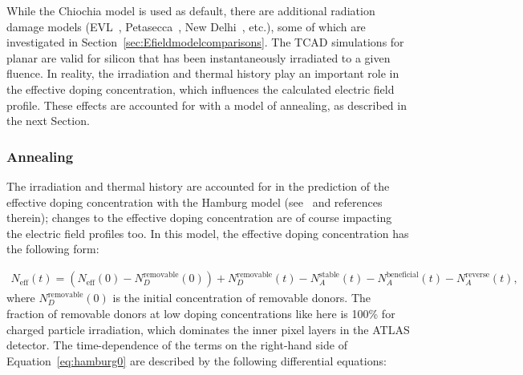

While the Chiochia model is used as default, there are additional radiation damage models (EVL~\cite{bib:DP}, Petasecca~\cite{1710302}, New Delhi~\cite{dalal2014simulation}, etc.), some of which are investigated in Section~\ref{sec:Efieldmodelcomparisons}.  The TCAD simulations for planar  are valid for silicon that has been instantaneously irradiated to a given fluence.   In reality, the irradiation and thermal history play an important role in the effective doping concentration, which influences the calculated electric field profile.  These effects are accounted for with a model of annealing, as described in the next Section.


\subsubsection{Annealing}
\label{sec:annealing}

 The irradiation and thermal history are accounted for in the prediction of the effective doping concentration with the Hamburg model (see~\cite{moll-thesis} and references therein); changes 
 to the effective doping concentration are of course impacting the electric field profiles too.
  In this model, the effective doping concentration has the following form:

\begin{align}
\label{eq:hamburg0}
N_\text{eff}(t)=(N_\text{eff}(0)-N_{D}^\text{removable}(0))+N_{D}^\text{removable}(t)-N_{A}^\text{stable}(t)-N_{A}^\text{beneficial}(t)-N_{A}^\text{reverse}(t),
\end{align}
where $N_D^\text{removable}(0)$ is the initial concentration of removable donors.  The fraction of removable donors at low doping concentrations like here is 100\% for charged particle irradiation, which dominates the inner pixel layers in the ATLAS detector.  The time-dependence of the terms on the right-hand side of Equation~\ref{eq:hamburg0} are described by the following differential equations:

